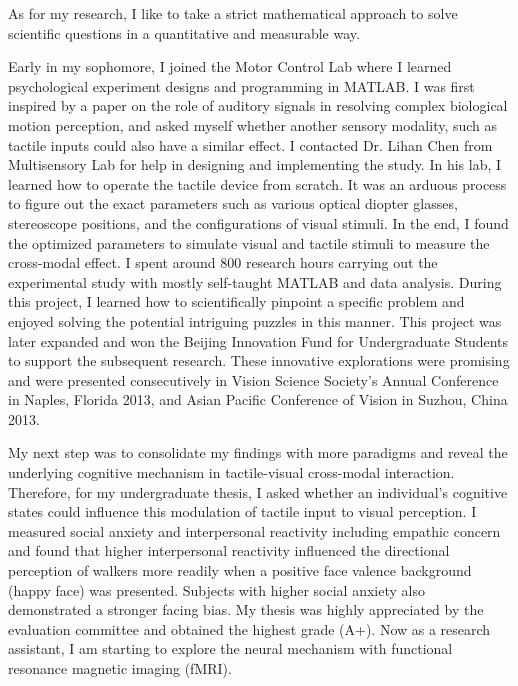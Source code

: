 As for my research, I like to take a strict mathematical approach to solve scientific questions in a quantitative and measurable way. 

Early in my sophomore, I joined the Motor Control Lab where I learned psychological experiment designs and programming in MATLAB. I was first inspired by a paper on the role of auditory signals in resolving complex biological motion perception, and asked myself whether another sensory modality, such as tactile inputs could also have a similar effect. I contacted Dr. Lihan Chen from Multisensory Lab for help in designing and implementing the study. In his lab, I learned how to operate the tactile device from scratch. It was an arduous process to figure out the exact parameters such as various optical diopter  glasses, stereoscope positions, and the configurations of visual stimuli. In the end, I found the optimized parameters to simulate visual and tactile stimuli to measure the cross-modal effect. I spent around 800 research hours carrying out the experimental study with mostly self-taught MATLAB and data analysis. During this project, I learned how to scientifically pinpoint a specific problem and enjoyed solving the potential intriguing puzzles in this manner. This project was later expanded and won the Beijing Innovation Fund for Undergraduate Students to support the subsequent research. These innovative explorations were promising and were presented consecutively in Vision Science Society's Annual Conference in Naples, Florida 2013, and Asian Pacific Conference of Vision in Suzhou, China 2013.

My next step was to consolidate my findings with more paradigms and reveal the underlying cognitive mechanism in tactile-visual cross-modal interaction. Therefore, for my undergraduate thesis, I asked whether an individual's cognitive states could influence this modulation of tactile input to visual perception. I measured social anxiety and interpersonal reactivity including empathic concern and found that higher interpersonal reactivity influenced the directional perception of walkers more readily when a positive face valence background (happy face) was presented. Subjects with higher social anxiety also demonstrated a stronger facing bias. My thesis was highly appreciated by the evaluation committee and obtained the highest grade (A+). Now as a research assistant, I am starting to explore the neural mechanism with functional resonance magnetic imaging (fMRI).


